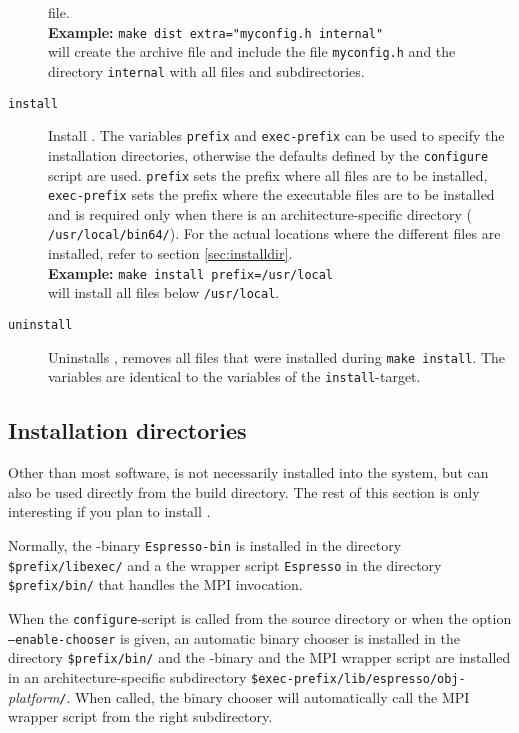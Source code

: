 \begin{description}
  file. \\
  \textbf{Example:} \verb!make dist extra="myconfig.h internal"!\\
  will create the archive file and include the file
  \texttt{myconfig.h} and the directory \texttt{internal} with all
  files and subdirectories.
\item[\texttt{install}] Install \es. The variables \texttt{prefix} and
  \texttt{exec-prefix} can be used to specify the installation
  directories, otherwise the defaults defined by the
  \texttt{configure} script are used. \texttt{prefix} sets the prefix
  where all \es files are to be installed, \texttt{exec-prefix} sets
  the prefix where the executable files are to be installed and is
  required only when there is an architecture-specific directory (\eg
  \texttt{/usr/local/bin64/}).  For the actual locations where the
  different files are installed, refer to section
  \vref{sec:installdir}.\\
  \textbf{Example:} \verb!make install prefix=/usr/local!\\
  will install all files below \texttt{/usr/local}.
\item[\texttt{uninstall}] Uninstalls \es{}, \ie{} removes all files
  that were installed during \texttt{make install}. The variables are
  identical to the variables of the \texttt{install}-target.
\end{description}

\subsection{Installation directories}
\label{sec:installdir}

 Other than most software, \es is not
necessarily installed into the system, but can also be used directly
from the build directory.  The rest of this section is only
interesting if you plan to install \es.

Normally, the \es-binary \texttt{Espresso-bin} is installed in the
directory \texttt{\$prefix/libexec/} and a the wrapper script
\texttt{Espresso} in the directory \texttt{\$prefix/bin/} that handles
the MPI invocation.

When the \texttt{configure}-script is called from the source directory
or when the option \texttt{--enable-chooser} is given, an automatic
binary chooser is installed in the directory \texttt{\$prefix/bin/}
and the \es-binary and the MPI wrapper script are installed in an
architecture-specific subdirectory
\mbox{\texttt{\$exec-prefix/lib/espresso/obj-}\textit{platform}\texttt{/}}.
When called, the binary chooser will automatically call the MPI
wrapper script from the right subdirectory.

